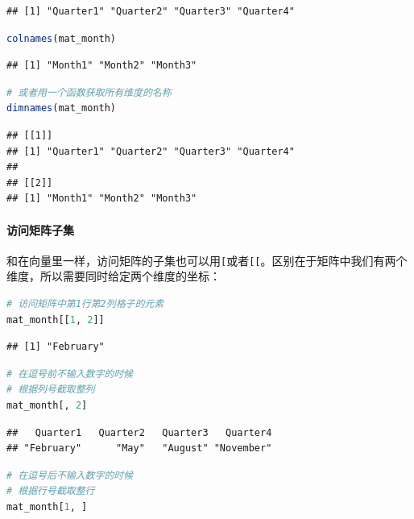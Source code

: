 \documentclass[]{ctexbook}
\let\oldparagraph\paragraph
\renewcommand{\paragraph}[1]{\oldparagraph{#1}\mbox{}}
\newcommand{\passthrough}[1]{#1}
\begin{document}
\begin{lstlisting}
## [1] "Quarter1" "Quarter2" "Quarter3" "Quarter4"
\end{lstlisting}

\begin{lstlisting}[language=R]
colnames(mat_month) 
\end{lstlisting}

\begin{lstlisting}
## [1] "Month1" "Month2" "Month3"
\end{lstlisting}

\begin{lstlisting}[language=R]
# 或者用一个函数获取所有维度的名称
dimnames(mat_month)
\end{lstlisting}

\begin{lstlisting}
## [[1]]
## [1] "Quarter1" "Quarter2" "Quarter3" "Quarter4"
## 
## [[2]]
## [1] "Month1" "Month2" "Month3"
\end{lstlisting}

\hypertarget{ux8bbfux95eeux77e9ux9635ux5b50ux96c6}{%
\paragraph{访问矩阵子集}\label{ux8bbfux95eeux77e9ux9635ux5b50ux96c6}}

和在向量里一样，访问矩阵的子集也可以用\passthrough{\lstinline![!}或者\passthrough{\lstinline![[!}。区别在于矩阵中我们有两个维度，所以需要同时给定两个维度的坐标：

\begin{lstlisting}[language=R]
# 访问矩阵中第1行第2列格子的元素
mat_month[[1, 2]]
\end{lstlisting}

\begin{lstlisting}
## [1] "February"
\end{lstlisting}

\begin{lstlisting}[language=R]
# 在逗号前不输入数字的时候
# 根据列号截取整列
mat_month[, 2]
\end{lstlisting}

\begin{lstlisting}
##   Quarter1   Quarter2   Quarter3   Quarter4 
## "February"      "May"   "August" "November"
\end{lstlisting}

\begin{lstlisting}[language=R]
# 在逗号后不输入数字的时候
# 根据行号截取整行
mat_month[1, ]
\end{lstlisting}
\end{document}

